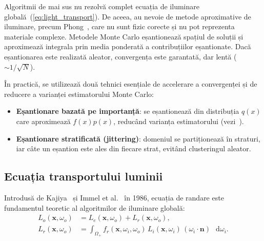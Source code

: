 \documentclass[12pt,a4paper]{report}
\newcommand*\diff{\mathop{}\!\mathrm{d}}
\numberwithin{equation}{section} %
\begin{document}
Algoritmii de mai sus nu rezolvă complet ecuația de iluminare globală~(\ref{eq:light_transport}).
De aceea, au nevoie de metode aproximative de iluminare, precum Phong~\cite{Phong}, care nu sunt fizic corecte și nu pot reprezenta materiale complexe.
Metodele Monte Carlo eșantionează spațiul de soluții și aproximează integrala prin media ponderată a contribuțiilor eșantionate.
Dacă eșantionarea este realizată aleator, convergența este garantată, dar lentă ($\sim 1/\sqrt{N}$).

În practică, se utilizează două tehnici esențiale de accelerare a convergenței și de reducere a varianței estimatorului Monte Carlo:
\begin{itemize}
    \item \textbf{Eșantionare bazată pe importanță}: se eșantionează din distribuția $q(x)$ care aproximează $f(x)p(x)$, reducând varianța estimatorului (vezi~\cite{DieXaR2024}).
    \item \textbf{Eșantionare stratificată (jittering)}: domeniul se partiționează în straturi, iar câte un eșantion este ales din fiecare strat, evitând clusteringul aleator.
\end{itemize}

\subsection{Ecuația transportului luminii}

Introdusă de Kajiya~\cite{Kajiya} și Immel et al.~\cite{Immel} în 1986, ecuația
de randare este fundamentul teoretic al algoritmilor de iluminare globală:
\begin{equation}
    \label{eq:light_transport}
    \begin{aligned}
        L_o(\mathbf{x}, \omega_o) &= L_e(\mathbf{x}, \omega_o) + L_r(\mathbf{x}, \omega_o), \\
        L_r(\mathbf{x}, \omega_o) &= \int_{\Omega_+} f_r(\mathbf{x}, \omega_i, \omega_o)\,
            L_i(\mathbf{x}, \omega_i)\,(\omega_i \cdot \mathbf{n})\,\diff\omega_i.
    \end{aligned}
\end{equation}
\end{document}
